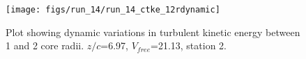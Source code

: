 \begin{figure}[H]
\centering
\texttt{[image: figs/run\_14/run\_14\_ctke\_12rdynamic]}
\caption{Plot showing dynamic variations in turbulent kinetic energy between 1 and 2 core radii. $z/c$=6.97, $V_{free}$=21.13, station 2.}
\label{fig:run_14_ctke_12rdynamic}
\end{figure}


